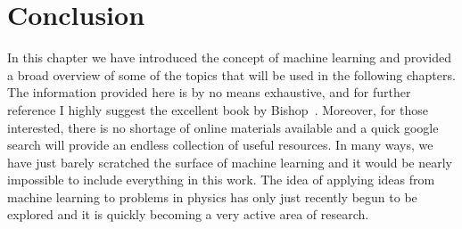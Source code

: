 \documentclass[../main.tex]{subfiles}
\begin{document}
\section{Conclusion}
In this chapter we have introduced the concept of machine learning and provided
a broad overview of some of the topics that will be used in the following
chapters.
%
The information provided here is by no means exhaustive, and for further
reference I highly suggest the excellent book by Bishop~\cite{Bishop}.
%
Moreover, for those interested, there is no shortage of online materials
available and a quick google search will provide an endless collection of
useful resources.
%
In many ways, we have just barely scratched the surface of machine learning and
it would be nearly impossible to include everything in this work.
%
The idea of applying ideas from machine learning to problems in physics has
only just recently begun to be explored and it is quickly becoming a very
active area of research.
\end{document}
